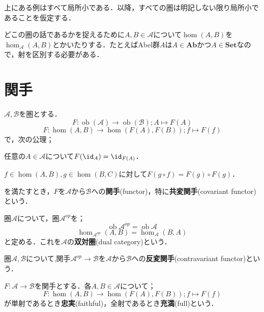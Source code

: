 上にある例はすべて局所小である．以降，すべての圏は明記しない限り局所小であることを仮定する．

どこの圏の話であるかを捉えるために$A,B\in\mathscr{A}$について$\hom(A,B)$を$\hom_{\mathscr{A}}(A,B)$とかいたりする．たとえばAbel群$A$は$A\in\mathbf{Ab}$かつ$A\in\mathbf{Set}$なので，射を区別する必要がある．

\section{関手}
\begin{defi}[関手]
	$\mathscr{A},\mathscr{B}$を圏とする．
	\[F:\operatorname{ob}(\mathscr{A})\to\operatorname{ob}(\mathscr{B});A\mapsto F(A)\]
	\[F:\hom(A,B)\to\hom(F(A),F(B));f\mapsto F(f)\]
	で，次の公理；
	\begin{sakura}
		\item 任意の$A\in\mathscr{A}$について$F(\id_A)=\id_{F(A)}$．
		\item $f\in\hom(A,B),g\in\hom(B,C)$に対して$F(g\circ f)=F(g)\circ F(g)$．
	\end{sakura}
	を満たすとき，$F$を$\mathscr{A}$から$\mathscr{B}$への\textbf{関手}(functor)，特に\textbf{共変関手}(covariant functor)という．
\end{defi}
\begin{defi}[双対圏]
	圏$\mathscr{A}$について，圏$\mathscr{A}^{op}$を；
	\[\operatorname{ob}\mathscr{A}^{op}=\operatorname{ob}\mathscr{A}\]
	\[\hom_{\mathscr{A}^{op}}(A,B)=\hom_{\mathscr{A}}(B,A)\]
	と定める．これを$\mathscr{A}$の\textbf{双対圏}(dual category)という．
\end{defi}
\begin{defi}[反変関手]
	圏$\mathscr{A},\mathscr{B}$について,関手$\mathscr{A}^{op}\to\mathscr{B}$を$\mathscr{A}$から$\mathscr{B}$への\textbf{反変関手}(contravariant functor)という．
\end{defi}
\begin{defi}[忠実，充満]
	$F:\mathscr{A}\to\mathscr{B}$を関手とする．各$A,B\in\mathscr{A}$について；
	\[F:\hom(A,B)\to\hom(F(A),F(B));f\mapsto F(f)\]
	が単射であるとき\textbf{忠実}(faithful)，全射であるとき\textbf{充満}(full)という．
\end{defi}
\begin{figure}[H]
	\centering
	\caption{}
\end{figure}

